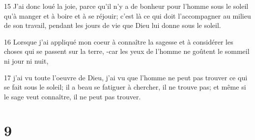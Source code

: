 \par 15 J'ai donc loué la joie, parce qu'il n'y a de bonheur pour l'homme sous le soleil qu'à manger et à boire et à se réjouir; c'est là ce qui doit l'accompagner au milieu de son travail, pendant les jours de vie que Dieu lui donne sous le soleil.
\par 16 Lorsque j'ai appliqué mon coeur à connaître la sagesse et à considérer les choses qui se passent sur la terre, -car les yeux de l'homme ne goûtent le sommeil ni jour ni nuit,
\par 17 j'ai vu toute l'oeuvre de Dieu, j'ai vu que l'homme ne peut pas trouver ce qui se fait sous le soleil; il a beau se fatiguer à chercher, il ne trouve pas; et même si le sage veut connaître, il ne peut pas trouver.

\chapter{9}

